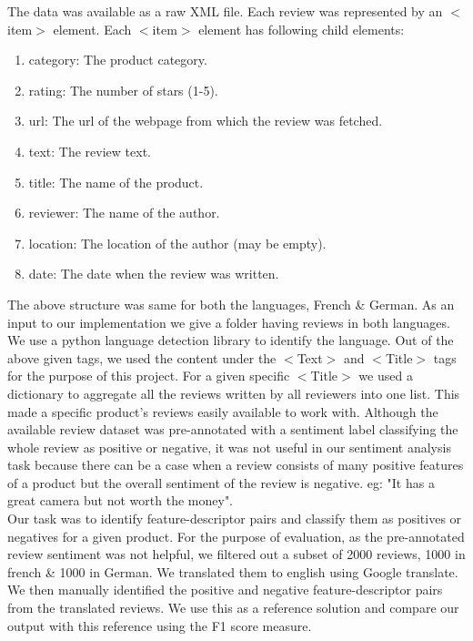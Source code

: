 \documentclass[conference]{IEEEtran}
\begin{document}
\indent The data was available as a raw XML file. Each review was represented by an $<$item$>$ element. Each $<$item$>$ element has following child elements: \begin{enumerate} \item category: The product category. \item rating: The number of stars (1-5). \item url: The url of the webpage from which the review was fetched.\item text: The review text. \item title: The name of the product.\item reviewer: The name of the author. \item location: The location of the author (may be empty). \item date: The date when the review was written.\end{enumerate}
\indent The above structure was same for both the languages, French \& German. As an input to our implementation we give a folder having reviews in both languages. We use a python language detection library to identify the language. Out of the above given tags, we used the content under the $<$Text$>$ and $<$Title$>$ tags for the purpose of this project. For a given specific $<$Title$>$ we used a dictionary to aggregate all the reviews written by all reviewers into one list. This made a specific product$’$s reviews easily available to work with. Although the available review dataset was pre-annotated with a sentiment label classifying the whole review as positive or negative, it was not useful in our sentiment analysis task because there can be a case when a review consists of many positive features of a product but the overall sentiment of the review is negative. eg: "It has a great camera but not worth the money".\\
\indent Our task was to identify feature-descriptor pairs and classify them as positives or negatives for a given product. For the purpose of evaluation, as the pre-annotated review sentiment was  not helpful, we filtered out a subset of 2000 reviews, 1000 in french \& 1000 in German.  We translated them to english using Google translate. We then manually identified the positive and negative feature-descriptor pairs from the translated reviews. We use this as a reference solution and compare our output with this reference using the F1 score measure.\\\\\\\\\\
\end{document}

